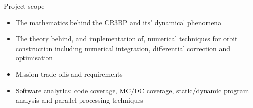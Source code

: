 \documentclass[10pt]{beamer}
\begin{document}
\begin{frame}{Project scope}
	\begin{itemize}
		\item The mathematics behind the CR3BP and its' dynamical phenomena
		\item The theory behind, and implementation of, numerical techniques for orbit construction including numerical integration, differential correction and optimisation
		\item Mission trade-offs and requirements
		\item Software analytics: code coverage, MC/DC coverage, static/dynamic program analysis and parallel processing techniques
	\end{itemize}
\end{frame}

%
%	
%
\end{document}
